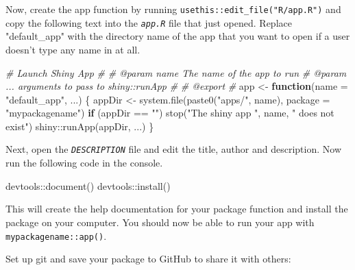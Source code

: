 \documentclass[
  oneside]{book}
\newenvironment{Shaded}{\begin{snugshade}}{\end{snugshade}}
\newcommand{\AttributeTok}[1]{\textcolor[rgb]{0.77,0.63,0.00}{#1}}
\newcommand{\CommentTok}[1]{\textcolor[rgb]{0.56,0.35,0.01}{\textit{#1}}}
\newcommand{\ControlFlowTok}[1]{\textcolor[rgb]{0.13,0.29,0.53}{\textbf{#1}}}
\newcommand{\FunctionTok}[1]{\textcolor[rgb]{0.00,0.00,0.00}{#1}}
\newcommand{\NormalTok}[1]{#1}
\newcommand{\OtherTok}[1]{\textcolor[rgb]{0.56,0.35,0.01}{#1}}
\newcommand{\SpecialCharTok}[1]{\textcolor[rgb]{0.00,0.00,0.00}{#1}}
\newcommand{\StringTok}[1]{\textcolor[rgb]{0.31,0.60,0.02}{#1}}
\begin{document}
Now, create the app function by running \texttt{usethis::edit\_file("R/app.R")} and copy the following text into the \textit{\texttt{app.R}} file that just opened. Replace \StringTok{"default\_app"} with the directory name of the app that you want to open if a user doesn't type any name in at all.

\begin{Shaded}
\begin{Highlighting}[]
\CommentTok{\#\textquotesingle{} Launch Shiny App}
\CommentTok{\#\textquotesingle{}}
\CommentTok{\#\textquotesingle{} @param name The name of the app to run}
\CommentTok{\#\textquotesingle{} @param ... arguments to pass to shiny::runApp}
\CommentTok{\#\textquotesingle{}}
\CommentTok{\#\textquotesingle{} @export}
\CommentTok{\#\textquotesingle{}}
\NormalTok{app }\OtherTok{\textless{}{-}} \ControlFlowTok{function}\NormalTok{(}\AttributeTok{name =} \StringTok{"default\_app"}\NormalTok{, ...) \{}
\NormalTok{    appDir }\OtherTok{\textless{}{-}} \FunctionTok{system.file}\NormalTok{(}\FunctionTok{paste0}\NormalTok{(}\StringTok{"apps/"}\NormalTok{, name), }\AttributeTok{package =} \StringTok{"mypackagename"}\NormalTok{)}
    \ControlFlowTok{if}\NormalTok{ (appDir }\SpecialCharTok{==} \StringTok{""}\NormalTok{)}
        \FunctionTok{stop}\NormalTok{(}\StringTok{"The shiny app "}\NormalTok{, name, }\StringTok{" does not exist"}\NormalTok{)}
\NormalTok{    shiny}\SpecialCharTok{::}\FunctionTok{runApp}\NormalTok{(appDir, ...)}
\NormalTok{\}}
\end{Highlighting}
\end{Shaded}

Next, open the \textit{\texttt{DESCRIPTION}} file and edit the title, author and description. Now run the following code in the console.

\begin{Shaded}
\begin{Highlighting}[]
\NormalTok{devtools}\SpecialCharTok{::}\FunctionTok{document}\NormalTok{()}
\NormalTok{devtools}\SpecialCharTok{::}\FunctionTok{install}\NormalTok{()}
\end{Highlighting}
\end{Shaded}

This will create the help documentation for your package function and install the package on your computer. You should now be able to run your app with \texttt{mypackagename::app}\texttt{()}.

Set up git and save your package to GitHub to share it with others:
\end{document}
